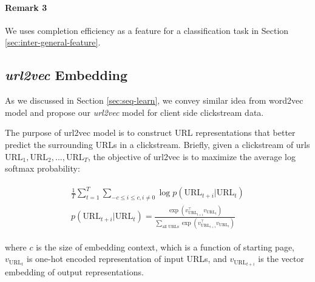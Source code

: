 \paragraph{Remark 3} We uses completion efficiency as a
feature for a classification task in Section \ref{sec:inter-general-feature}.



\subsection{\emph{url2vec} Embedding}

As we discussed in Section \ref{sec:seq-learn}, we convey similar idea from word2vec model 
and propose our \emph{url2vec} model for client side clickstream data.

The purpose of url2vec model is to construct URL representations that better predict 
the surrounding URLs in a clickstream. Briefly, given a clickstream of urls 
$\text{URL}_1, \text{URL}_2, ..., \text{URL}_T$, the objective of url2vec is to maximize 
the average log softmax probability:

\begin{align}
\label{eqn:url2vecprob}
\begin{split}
    \frac{1}{T}\sum^{T}_{t=1}\sum_{-c \leq i \leq c, i \neq 0} {\log{p(\text{URL}_{t+i} | \text{URL}_t)}}\\
    p(\text{URL}_{t+i} | \text{URL}_t) = \frac{
        \exp{(v_{\text{URL}_{t+i}} ^\top v_{\text{URL}_t})}
    }{
        \sum_{\text{all URLs}} {\exp{(v_{\text{URL}_{t+i}} ^\top v_{\text{URL}_t})}}
    }
\end{split}
\end{align}

where $c$ is the size of embedding context, which is a function of starting page,
$v_{\text{URL}_t}$ is one-hot encoded representation of input URLs, and 
$v_{\text{URL}_{t+i}}$ is the vector embedding of output representations.

